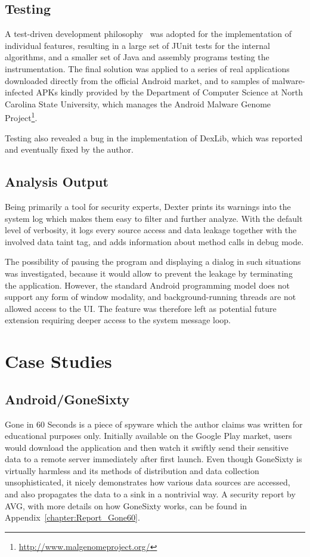 \documentclass[12pt,twoside,notitlepage]{report}
\newcommand{\weblink}[1] {\footnote{\scriptsize\url{#1}}}
\begin{document}
\subsection{Testing}

A test-driven development philosophy~\cite{Beck:2002:TDD:579193} was adopted for the implementation of individual features, resulting in a large set of JUnit tests for the internal algorithms, and a smaller set of Java and assembly programs testing the instrumentation. The final solution was applied to a series of real applications downloaded directly from the official Android market, and to samples of malware-infected APKs kindly provided by the Department of Computer Science at North Carolina State University, which manages the Android Malware Genome Project\weblink{http://www.malgenomeproject.org/}.

Testing also revealed a bug in the implementation of DexLib, which was reported and eventually fixed by the author.

\subsection{Analysis Output}

Being primarily a tool for security experts, Dexter prints its warnings into the system log which makes them easy to filter and further analyze. With the default level of verbosity, it logs every source access and data leakage together with the involved data taint tag, and adds information about method calls in debug mode.

The possibility of pausing the program and displaying a dialog in such situations was investigated, because it would allow to prevent the leakage by terminating the application. However, the standard Android programming model does not support any form of window modality, and background-running threads are not allowed access to the UI. The feature was therefore left as potential future extension requiring deeper access to the system message loop.

\section{Case Studies}

\subsection{Android/GoneSixty}

Gone in 60 Seconds is a piece of spyware which the author claims was written for educational purposes only. Initially available on the Google Play market, users would download the application and then watch it swiftly send their sensitive data to a remote server immediately after first launch. Even though GoneSixty is virtually harmless and its methods of distribution and data collection unsophisticated, it nicely demonstrates how various data sources are accessed, and also propagates the data to a sink in a nontrivial way. A security report by AVG, with more details on how GoneSixty works, can be found in Appendix~\ref{chapter:Report_Gone60}.
\end{document}

